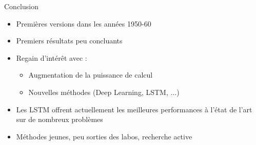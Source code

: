 \begin{frame}{Conclusion}
    \begin{itemize}
        \item Premières versions dans les années 1950-60
        \item Premiers résultats peu concluants
        \item Regain d'intérêt avec :
        \begin{itemize}
            \item Augmentation de la puissance de calcul
            \item Nouvelles méthodes (Deep Learning, LSTM, ...)
        \end{itemize}
        \item Les LSTM offrent actuellement les meilleures performances à l'état de l'art sur de nombreux problèmes
        \item Méthodes jeunes, peu sorties des labos, recherche active
    \end{itemize}
\end{frame}

